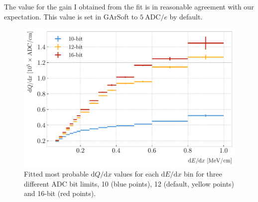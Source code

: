 The value for the gain I obtained from the fit is in reasonable agreement with our expectation. This value is set in GArSoft to $5 \ \mathrm{ADC}/e$ by default.

\begin{figure}[t]
	\centering
	\includegraphics[width=.85\linewidth]{Images/GArSoft_PID/dEdx/dEdx_vs_dQdx_ADC_saturation_mpv.pdf}
	\caption[Fitted most probable $\mathrm{d}Q/\mathrm{d}x$ values for each $\mathrm{d}E/\mathrm{d}x$ bin for three different ADC bit limits.]{Fitted most probable $\mathrm{d}Q/\mathrm{d}x$ values for each $\mathrm{d}E/\mathrm{d}x$ bin for three different ADC bit limits, 10 (blue points), 12 (default, yellow points) and 16-bit (red points).}
	\label{fig:energy_adc_saturation}
\end{figure}

